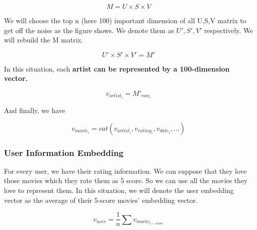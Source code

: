 \documentclass[]{article}
\begin{document}
\[M = U\times S\times V\]

We will choose the top n (here 100) important dimension of all U,S,V
matrix to get off the noise as the figure shows. We denote them as
\(U',S',V'\) respectively. We will rebuild the M matrix.

\[U'\times S'\times V' = M'\]

In this situation, each \textbf{artist can be represented by a
100-dimension vector.}

\[v_{artist_{i}} = M'_{row_{i}}\]

And finally, we have

\[v_{movie_i} = cat(v_{artist_i},v_{rating_i}, v_{date_i},...)\]

\hypertarget{header-n298}{%
\subsubsection{User Information Embedding}\label{header-n298}}

For every user, we have their rating information. We can suppose that
they love those movies which they rate them as 5 score. So we can use
all the movies they love to represent them. In this situation, we will
denote the user embedding vector as the average of their 5-score movies'
embedding vector.

\[v_{user} = \dfrac{1}{n}\sum v_{movie_{5-score}}\]
\end{document}
